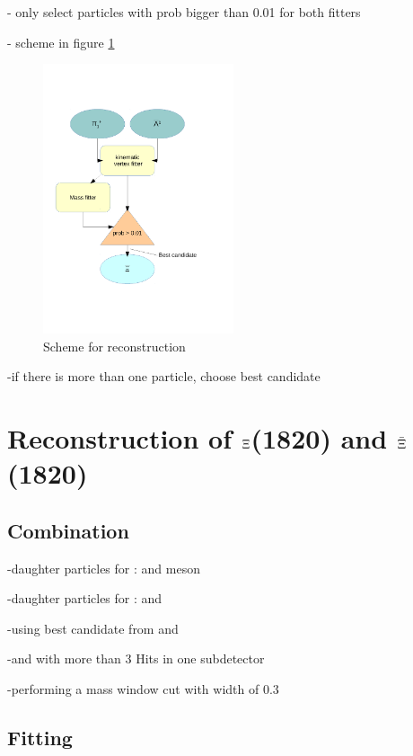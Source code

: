 		- only select particles with prob bigger than 0.01 for both fitters
		
		- scheme in figure \ref{fig:anticascade_scheme}
		
		\begin{figure}
			\centering
				\includegraphics[width=0.50\textwidth]{./plots/combineAntiCascade.pdf}
			\caption{Scheme for \anticascade reconstruction}
			\label{fig:anticascade_scheme}
		\end{figure}
		
		-if there is more than one particle, choose best candidate

\section{Reconstruction of $\boldmath{\Xi}$(1820) and $\boldmath{\bar{\Xi}}$(1820)}
		\subsection{Combination}

		
		-daughter particles for \excitedcascade: \lam and \kminus meson
		
		-daughter particles for \excitedanticascade: \alam and \kplus 
		
		-using best candidate from \lam and \alam
		
		-\kplus and \kminus with more than 3 Hits in one subdetector 
		
		-performing a mass window cut with width of $0.3$\massunit 
		
		
	\subsection{Fitting}
	
